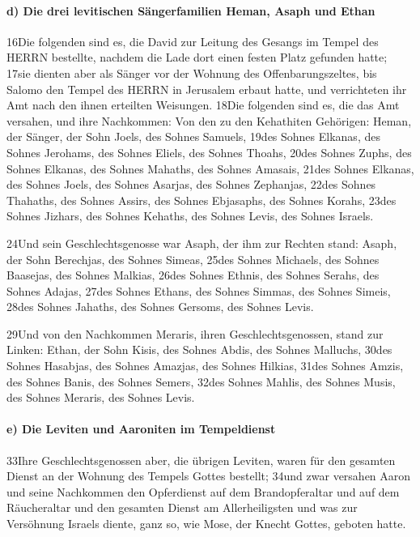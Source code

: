 \hypertarget{d-die-drei-levitischen-suxe4ngerfamilien-heman-asaph-und-ethan}{%
\paragraph{d) Die drei levitischen Sängerfamilien Heman, Asaph und
Ethan}\label{d-die-drei-levitischen-suxe4ngerfamilien-heman-asaph-und-ethan}}

16Die folgenden sind es, die David zur Leitung des Gesangs im Tempel des
HERRN bestellte, nachdem die Lade dort einen festen Platz gefunden
hatte; 17sie dienten aber als Sänger vor der Wohnung des
Offenbarungszeltes, bis Salomo den Tempel des HERRN in Jerusalem erbaut
hatte, und verrichteten ihr Amt nach den ihnen erteilten Weisungen.
18Die folgenden sind es, die das Amt versahen, und ihre Nachkommen: Von
den zu den Kehathiten Gehörigen: Heman, der Sänger, der Sohn Joels, des
Sohnes Samuels, 19des Sohnes Elkanas, des Sohnes Jerohams, des Sohnes
Eliels, des Sohnes Thoahs, 20des Sohnes Zuphs, des Sohnes Elkanas, des
Sohnes Mahaths, des Sohnes Amasais, 21des Sohnes Elkanas, des Sohnes
Joels, des Sohnes Asarjas, des Sohnes Zephanjas, 22des Sohnes Thahaths,
des Sohnes Assirs, des Sohnes Ebjasaphs, des Sohnes Korahs, 23des Sohnes
Jizhars, des Sohnes Kehaths, des Sohnes Levis, des Sohnes Israels.

24Und sein Geschlechtsgenosse war Asaph, der ihm zur Rechten stand:
Asaph, der Sohn Berechjas, des Sohnes Simeas, 25des Sohnes Michaels, des
Sohnes Baasejas, des Sohnes Malkias, 26des Sohnes Ethnis, des Sohnes
Serahs, des Sohnes Adajas, 27des Sohnes Ethans, des Sohnes Simmas, des
Sohnes Simeis, 28des Sohnes Jahaths, des Sohnes Gersoms, des Sohnes
Levis.

29Und von den Nachkommen Meraris, ihren Geschlechtsgenossen, stand zur
Linken: Ethan, der Sohn Kisis, des Sohnes Abdis, des Sohnes Malluchs,
30des Sohnes Hasabjas, des Sohnes Amazjas, des Sohnes Hilkias, 31des
Sohnes Amzis, des Sohnes Banis, des Sohnes Semers, 32des Sohnes Mahlis,
des Sohnes Musis, des Sohnes Meraris, des Sohnes Levis.

\hypertarget{e-die-leviten-und-aaroniten-im-tempeldienst}{%
\paragraph{e) Die Leviten und Aaroniten im
Tempeldienst}\label{e-die-leviten-und-aaroniten-im-tempeldienst}}

33Ihre Geschlechtsgenossen aber, die übrigen Leviten, waren für den
gesamten Dienst an der Wohnung des Tempels Gottes bestellt; 34und zwar
versahen Aaron und seine Nachkommen den Opferdienst auf dem
Brandopferaltar und auf dem Räucheraltar und den gesamten Dienst am
Allerheiligsten und was zur Versöhnung Israels diente, ganz so, wie
Mose, der Knecht Gottes, geboten hatte.

